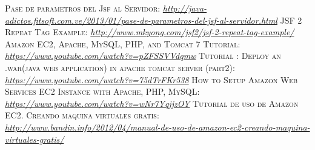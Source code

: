 \documentclass[a4paper,10pt]{scrartcl}
\begin{document}
	
\pagebreak
\begin{thebibliography}{20}
  \textsc{Pase de parametros del Jsf al Servidor}:
 \textit{\url{http://java-adictos.fitsoft.com.ve/2013/01/pase-de-parametros-del-jsf-al-servidor.html}}
  \textsc{JSF 2 Repeat Tag Example}:
 \textit{\url{http://www.mkyong.com/jsf2/jsf-2-repeat-tag-example/}}
  \textsc{Amazon EC2, Apache, MySQL, PHP, and Tomcat 7 Tutorial}:
 \textit{\url{https://www.youtube.com/watch?v=pZFSSVVdqmw}}
  \textsc{Tutorial : Deploy an .war(java web application) in apache tomcat server (part2)}:
 \textit{\url{https://www.youtube.com/watch?v=75dTrFKr538}}
  \textsc{How to Setup Amazon Web Services EC2 Instance with Apache, PHP, MySQL}:
 \textit{\url{https://www.youtube.com/watch?v=wNr7YqjjzOY}}
  \textsc{Tutorial de uso de Amazon EC2. Creando maquina virtuales gratis}:
 \textit{\url{http://www.bandin.info/2012/04/manual-de-uso-de-amazon-ec2-creando-maquina-virtuales-gratis/}}



\end{thebibliography}
\end{document}

